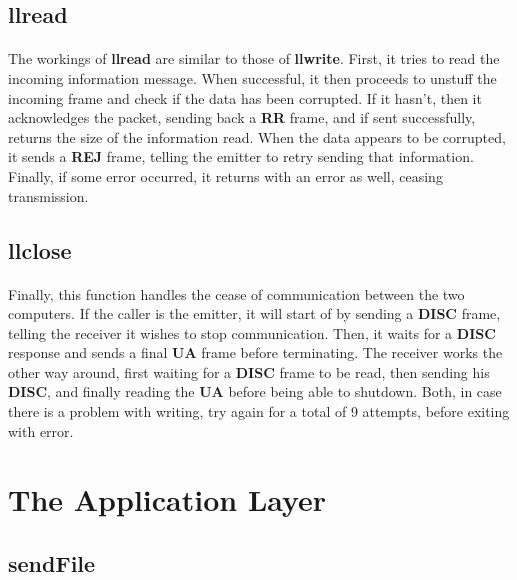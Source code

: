 \documentclass[11pt]{article}
\begin{document}
\subsection*{llread}

\paragraph{}The workings of \textbf{llread} are similar to those of \textbf{llwrite}. First, it tries to read the incoming information message. When successful, it then proceeds to unstuff the incoming frame and
check if the data has been corrupted. If it hasn't, then it acknowledges the packet, sending back a
\textbf{RR} frame, and if sent successfully, returns the size of the information read. When the data appears
to be corrupted, it sends a \textbf{REJ} frame, telling the emitter to retry sending that information.
Finally, if some error occurred, it returns with an error as well, ceasing transmission.

\subsection*{llclose}

\paragraph{}Finally, this function handles the cease of communication between the two computers. If the
caller is the emitter, it will start of by sending a \textbf{DISC} frame, telling the receiver it wishes to
stop communication. Then, it waits for a \textbf{DISC} response and sends a final \textbf{UA} frame before
terminating. The receiver works the other way around, first waiting for a \textbf{DISC} frame to be read,
then sending his \textbf{DISC}, and finally reading the \textbf{UA} before being able to shutdown. Both, in
case there is a problem with writing, try again for a total of 9 attempts, before exiting with error.

\section{The Application Layer}

\subsection*{sendFile}
\end{document}
